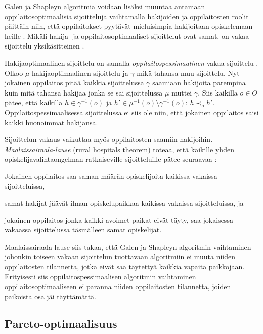 \documentclass[twoside]{tktltiki}
\begin{document}
Galen ja Shapleyn algoritmia voidaan lisäksi muuntaa antamaan
oppilaitosoptimaalisia sijoitteluja vaihtamalla hakijoiden ja
oppilaitosten roolit päittäin niin, että oppilaitokset pyytävät
mieluisimpia hakijoitaan opiskelemaan heille \cite{galeshapley62}.
Mikäli hakija- ja oppilaitosoptimaaliset sijoittelut ovat samat, on
vakaa sijoittelu yksikäsitteinen \cite{galeshapley62}.

Hakijaoptimaalinen sijoittelu on samalla
\emph{oppilaitospessimaalinen} vakaa sijoittelu \cite{gusfield89}.
Olkoo $\mu$ hakijaoptimaalinen sijoittelu ja $\gamma$ mikä tahansa muu
sijoittelu. Nyt jokainen oppilaitos pitää kaikkia sijoittelussa
$\gamma$ saamiaan hakijoita parempina kuin mitä tahansa hakijaa jonka
se sai sijoittelussa $\mu$ muttei $\gamma$. Siis kaikilla $o \in O$
pätee, että kaikilla $h \in \gamma^{-1}(o)$ ja $h' \in \mu^{-1}(o)
\setminus \gamma^{-1}(o)$: $h \prec_o h'$. Oppilaitospessimaalisessa
sijoittelussa ei siis ole niin, että jokainen oppilaitos saisi kaikki
huonoimmat hakijansa.

Sijoittelun vakaus vaikuttaa myös oppilaitosten saamiin hakijoihin.
\emph{Maalaissairaala-lause} (rural hospitals theorem) toteaa, että
kaikille yhden opiskelijavalintaongelman ratkaiseville sijoitteluille
pätee seuraavaa \cite{gusfield89}:
\newpage

\begin{itemize*}
  \item Jokainen oppilaitos saa saman määrän opiskelijoita kaikissa
    vakaissa sijoitteluissa,
  \item samat hakijat jäävät ilman opiskelupaikkaa kaikissa vakaissa
    sijoitteluissa, ja
  \item jokainen oppilaitos jonka kaikki avoimet paikat eivät täyty,
    saa jokaisessa vakaassa sijoittelussa täsmälleen samat
    opiskelijat.
\end{itemize*}

Maalaissairaala-lause siis takaa, että Galen ja Shapleyn algoritmin
vaihtaminen johonkin toiseen vakaan sijoittelun tuottavaan algoritmiin
ei muuta niiden oppilaitosten tilannetta, jotka eivät saa täytettyä
kaikkia vapaita paikkojaan. Erityisesti siis oppilaitospessimaalisen
algoritmin vaihtaminen oppilaitosoptimaaliseen ei paranna niiden
oppilaitosten tilannetta, joiden paikoista osa jäi täyttämättä.

\subsection{Pareto-optimaalisuus}
\end{document}

